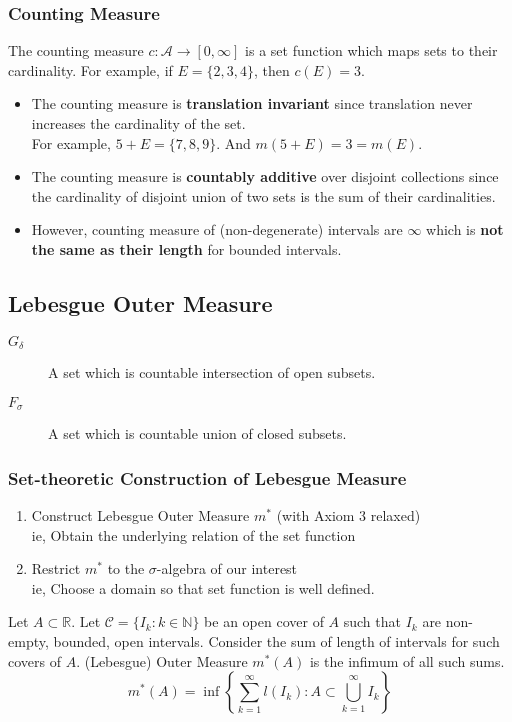 \subsubsection{Counting Measure}
	The counting measure $c : \mathcal{A} \to [0,\infty]$ is a set function which maps sets to their cardinality. For example, if $E = \{2,3,4\}$, then $c(E) = 3$.
\begin{itemize}
	\item The counting measure is \textbf{translation invariant} since translation never increases the cardinality of the set.\\
		For example, $5+E = \{7,8,9\}$. And $m(5+E) = 3 = m(E)$.
	\item The counting measure is \textbf{countably additive} over disjoint collections since the cardinality of disjoint union of two sets is the sum of their cardinalities.
	\item However, counting measure of (non-degenerate) intervals are $\infty$ which is \textbf{not the same as their length} for bounded intervals.
\end{itemize}

\subsection{Lebesgue Outer Measure}
\begin{description}
	\item[$G_\delta$] A set which is countable intersection of open subsets.
	\item[$F_\sigma$] A set which is countable union of closed subsets.
\end{description}

\subsubsection{Set-theoretic Construction of Lebesgue Measure}
\begin{enumerate}
	\item Construct Lebesgue Outer Measure $m^\ast$ (with Axiom 3 relaxed) \\
		ie, Obtain the underlying relation of the set function
	\item Restrict $m^\ast$ to the $\sigma$-algebra of our interest \\
		ie, Choose a domain so that set function is well defined.
\end{enumerate}
\begin{definition}
	Let $A \subset \mathbb{R}$. Let $\mathcal{C} = \{ I_k : k \in \mathbb{N}\}$ be an open cover of $A$ such that $I_k$ are non-empty, bounded, open intervals. Consider the sum of length of intervals for such covers of $A$. (Lebesgue) Outer Measure $m^\ast(A)$ is the infimum of all such sums.
\begin{equation}
	 m^\ast(A) = \inf \left\{ \sum_{k=1}^\infty l(I_k) : A \subset \bigcup_{k=1}^\infty I_k \right\} 
	 \label{eq:outermeasure}
\end{equation}
\end{definition}
